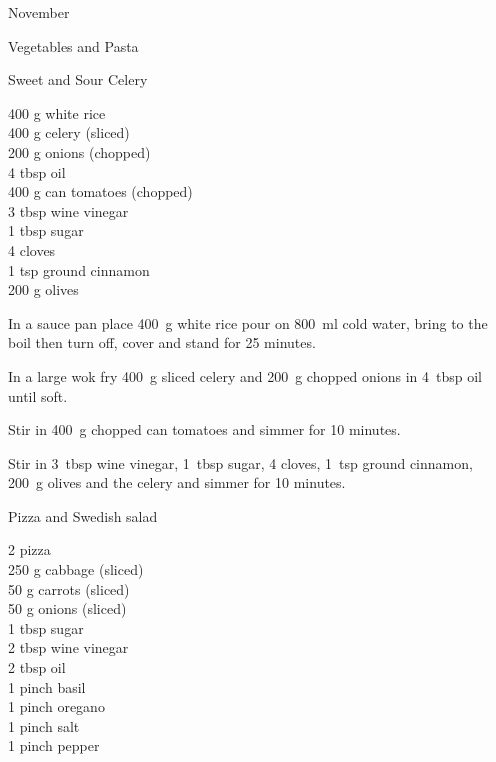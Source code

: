 \begin{menu}{November}
\begin{recipe}{2}{Vegetables and Pasta}
\begin{instructions}
    \end{instructions}
    \end{recipe}%
  
    \begin{recipe}{2}{Sweet and Sour Celery}%
		\begin{ingredients}
		400 g white rice  \\
	400 g celery (sliced) \\
	200 g onions (chopped) \\
	4 tbsp oil  \\
	400 g can tomatoes (chopped) \\
	3 tbsp wine vinegar  \\
	1 tbsp sugar  \\
	4  cloves  \\
	1 tsp ground cinnamon  \\
	200 g olives  \\
	
		\end{ingredients}
	
	
    \begin{instructions}
    \item 
    In a
    sauce pan
    place
    400~g  white rice
    pour on
    800~ml  cold water,
    bring to the boil then turn off, cover and stand for 25 minutes.
  \item 
        In a large wok fry
        400~g sliced celery
        and
        200~g chopped onions
        in
        4~tbsp  oil
        until soft.
      \item 
        Stir in
        400~g chopped can tomatoes
        and simmer for 10 minutes.
      \item 
        Stir in
        3~tbsp  wine vinegar,
        1~tbsp  sugar,
        4  cloves,
        1~tsp  ground cinnamon,
        200~g  olives
        and the celery
        and simmer for 10 minutes.
      
    \end{instructions}
    \end{recipe}%
  
    \begin{recipe}{1}{Pizza and Swedish salad}%
		\begin{ingredients}
		2  pizza  \\
	250 g cabbage (sliced) \\
	50 g carrots (sliced) \\
	50 g onions (sliced) \\
	1 tbsp sugar  \\
	2 tbsp wine vinegar  \\
	2 tbsp oil  \\
	1 pinch basil  \\
	1 pinch oregano  \\
	1 pinch salt  \\
	1 pinch pepper  \\
	

\end{ingredients}
\end{recipe}
\end{menu}
